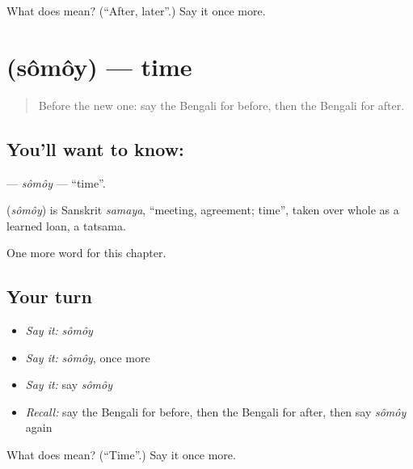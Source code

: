\begin{tcolorbox}[breakable,colback=teal!4,colframe=teal!35!black,title={Before you move on}]
What does  mean? (\textquotedblleft{}After, later\textquotedblright{}.) Say it once more.
\end{tcolorbox}
\section[\texorpdfstring{\bn{সময়} (sômôy)}{সময় (sômôy)}]{ (sômôy) — time}

\label{lesson:BN-C80-somoy}



\begin{quote}
Before the new one: say the Bengali for before, then the Bengali for after.
\end{quote}

\subsection*{You'll want to know: }
\textbf{} — \emph{sômôy} — \textquotedblleft{}time\textquotedblright{}.

\begin{cousinweb}
\textbf{} (\emph{sômôy}) is Sanskrit \emph{samaya}, \textquotedblleft{}meeting, agreement; time\textquotedblright{}, taken over whole as a learned loan, a tatsama.
\end{cousinweb}

\begin{grammarlens}[title={What you've built}]
One more word for this chapter.
\end{grammarlens}

\subsection*{Your turn}
\begin{itemize}
\raggedright
  \item \emph{Say it:} \emph{sômôy}
  \item \emph{Say it:} \emph{sômôy}, once more
  \item \emph{Say it:} say \emph{sômôy}
  \item \emph{Recall:} say the Bengali for before, then the Bengali for after, then say \emph{sômôy} again
\end{itemize}

\begin{tcolorbox}[breakable,colback=teal!4,colframe=teal!35!black,title={Before you move on}]
What does  mean? (\textquotedblleft{}Time\textquotedblright{}.) Say it once more.
\end{tcolorbox}
